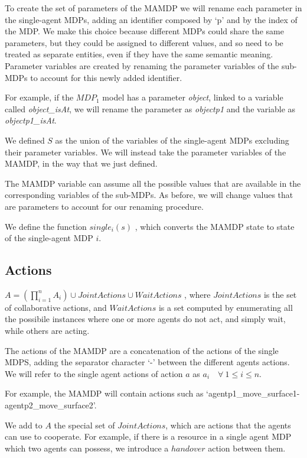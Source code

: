 To create the set of parameters of the MAMDP we will rename each parameter in the single-agent MDPs, adding an identifier composed by `p' and by the index of the MDP. We make this choice because different MDPs could share the same parameters, but they could be assigned to different values, and so need to be treated as separate entities, even if they have the same semantic meaning. Parameter variables are created by renaming the parameter variables of the sub-MDPs to account for this newly added identifier.

For example, if the $MDP_1$ model has a parameter \textit{object}, linked to a variable called \textit{object\_isAt}, we will rename the parameter as \textit{objectp1} and the variable as \textit{objectp1\_isAt}. 

We defined $S$ as the union of the variables of the single-agent MDPs excluding their parameter variables. We will instead take the parameter variables of the MAMDP, in the way that we just defined.

The MAMDP variable can assume all the possible values that are available in the corresponding variables of the sub-MDPs. As before, we will change values that are parameters to account for our renaming procedure. 

We define the function $single_i(s)$ , which converts the MAMDP state to state of the single-agent MDP $i$.


\subsection{Actions}
$A=(\prod_{i=1}^{n} A_i) \cup JointActions \cup WaitActions$ , where $JointActions$ is the set of collaborative actions, and $WaitActions$ is a set computed by enumerating all the possibile instances where one or more agents do not act, and simply wait, while others are acting.

The actions of the MAMDP are a concatenation of the actions of the single MDPS, adding the separator character `-' between the different agents actions. We will refer to the single agent actions of action $a$ as $a_i \quad \forall \> 1\leq i \leq n$.

For example, the MAMDP will contain actions such as `agentp1\_move\_surface1-agentp2\_move\_surface2'.

We add to $A$ the special set of $JointActions$, which are actions that the agents can use to cooperate. For example, if there is a resource in a single agent MDP which two agents can possess, we introduce a $handover$ action between them. 

